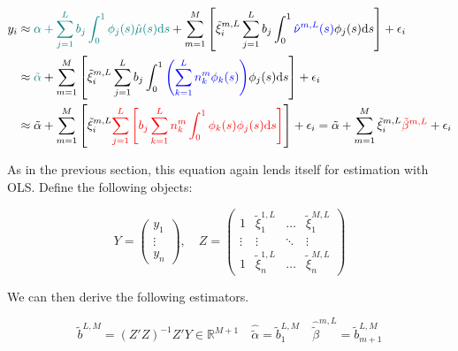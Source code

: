 \documentclass[11pt,twoside,a4paper]{article}
\begin{document}
	\begin{equation}
		\begin{split}
			y_i & \approx {\color{teal}\alpha + \sum_{j = 1}^{L} b_j \int_{0}^{1} \phi_j(s) \hat{\mu}(s) \mathrm{d}s} +  \sum_{m  = 1}^{M} \left[ \tilde{\xi}^{m,L}_{i} \sum_{j = 1}^{L} b_j \int_{0}^{1} {\color{blue}\hat{\nu}^{m,L}(s)} \phi_j(s) \mathrm{d}s \right] + \epsilon_i \\
			& \approx {\color{teal} \tilde{\alpha}} + \sum_{m  = 1}^{M} \left[ \tilde{\xi}^{m,L}_{i} \sum_{j = 1}^{L} b_j \int_{0}^{1}{\color{blue}\left(\sum_{k = 1}^{L} n_{k}^m \phi_{k}(s)\right)} \phi_j(s) \mathrm{d}s \right] + \epsilon_i \\
			& \approx \tilde{\alpha} + \sum_{m  = 1}^{M} \left[ \tilde{\xi}^{m,L}_{i} {\color{red}\sum_{j = 1}^{L} \left[ b_j \sum_{k = 1}^{L} n_{k}^m \int_{0}^{1} \phi_{k}(s) \phi_j(s) \mathrm{d}s \right]} \right]+ \epsilon_i
			= \tilde{\alpha} + \sum_{m  = 1}^{M} \tilde{\xi}^{m,L}_{i} {\color{red}\tilde{\beta}^{m,L}}+ \epsilon_i
		\end{split}
	\end{equation}

	As in the previous section, this equation again lends itself for estimation with OLS. Define the following objects:
	
	\begin{equation}
		Y = \begin{pmatrix}
			y_1 \\ \vdots \\ y_n
		\end{pmatrix}, \quad
		Z = \begin{pmatrix}
			1 & \tilde{\xi}^{1,L}_{1} & \dots & \tilde{\xi}^{M,L}_{1} \\
			\vdots & \vdots & \ddots & \vdots \\
			1 & \tilde{\xi}^{1,L}_{n} & \dots & \tilde{\xi}^{M,L}_{n}
		\end{pmatrix}
	\end{equation}
	
	We can then derive the following estimators.
	
	\begin{equation}
		\tilde{b}^{L,M} = \left(Z'Z\right)^{-1}Z'Y \in \mathbb{R}^{M+1} \quad \hat{\tilde{\alpha}} = \tilde{b}_{1}^{L,M} \quad \hat{\tilde{\beta}}^{m,L} = \tilde{b}^{L,M}_{m+1}
	\end{equation}
\end{document}
